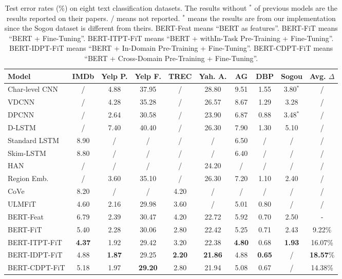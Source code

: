 \documentclass[11pt,a4paper]{article}
\theoremstyle{definition}
\begin{document}
\begin{CJK*}{UTF8}{gbsn}
\begin{table*}[h!]\small\setlength{\tabcolsep}{6pt}
		\centering
		\begin{tabular}{l c c c c c c c c c }
			\toprule
			Model & IMDb & Yelp P. & Yelp F. & TREC & Yah. A. & AG & DBP & Sogou & Avg. $\Delta$ \\
			\midrule
			Char-level CNN\cite{zhang2015character} & / & 4.88 & 37.95 & / & 28.80 & 9.51 & 1.55 & 3.80$^*$ & / \\
			VDCNN \cite{conneau2016very} & / & 4.28 & 35.28 & / & 26.57 & 8.67 & 1.29 & 3.28 & / \\
			DPCNN \cite{johnson2017deep} & / & 2.64 & 30.58 & / & 23.90 & 6.87 & 0.88 & 3.48$^*$ & / \\
			\midrule	
			D-LSTM \cite{yogatama2017generative} & / & 7.40 & 40.40 & / & 26.30 & 7.90 & 1.30 & 5.10 & / \\
			Standard LSTM \cite{seo2017neural} & 8.90 & / & / & / & / & 6.50 & / & / & / \\
			Skim-LSTM \cite{seo2017neural} & 8.80 & / & / & / & / & 6.40 & / & / & / \\
			HAN \cite{yang2016hierarchical} & / & / & / & / & 24.20 & / & / & / & / \\
			\midrule
			Region Emb. \cite{qiao2018anew} & / & 3.60 & 35.10 & / & 26.30 & 7.20 & 1.10 & 2.40 & / \\
			CoVe \cite{mccann2017learned} & 8.20 & / & / & 4.20 & / & / & / & / & / \\
			ULMFiT \cite{howard2018universal} & 4.60 & 2.16 & 29.98 & 3.60 & / & 5.01 & 0.80 & / & / \\
			\midrule
			BERT-Feat & 6.79 & 2.39 & 30.47 & 4.20 & 22.72 & 5.92 & 0.70 & 2.50 & - \\ BERT-FiT & 5.40 & 2.28 & 30.06 & 2.80 & 22.42 & 5.25 & 0.71 & 2.43 & 9.22\% \\  BERT-ITPT-FiT & \textbf{4.37} & 1.92 & 29.42 & 3.20 & 22.38 & \textbf{4.80} & 0.68 & \textbf{1.93} & 16.07\% \\ BERT-IDPT-FiT & 4.88 & \textbf{1.87} & 29.25 & \textbf{2.20} & \textbf{21.86} & 4.88 & \textbf{0.65} & / & \textbf{18.57}\% \\ BERT-CDPT-FiT & 5.18 & 1.97 & \textbf{29.20} & 2.80 & 21.94 & 5.08 & 0.67 & / & 14.38\% \\ \bottomrule
		\end{tabular}
		\caption{\label{tb:comparison} Test error rates (\%) on eight text classification datasets. The results without $^*$ of previous models are the results reported on their papers. / means not reported. $^*$ means the results are from our implementation since the Sogou dataset is different from theirs.  BERT-Feat means ``BERT as features''. BERT-FiT means ``BERT + Fine-Tuning''.
BERT-ITPT-FiT means ``BERT + withIn-Task Pre-Training + Fine-Tuning''. BERT-IDPT-FiT means ``BERT + In-Domain Pre-Training + Fine-Tuning''.  BERT-CDPT-FiT means ``BERT + Cross-Domain Pre-Training + Fine-Tuning''.
		}
	\end{table*}


\end{CJK*}
\end{document}
